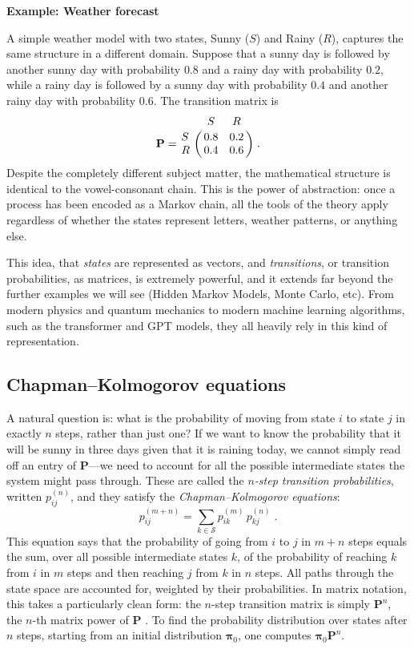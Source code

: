 \medskip

\textbf{Example: Weather forecast}

\medskip

A simple weather model with two states, Sunny ($S$) and Rainy ($R$), captures the same structure in a different domain. Suppose that a sunny day is followed by another sunny day with probability $0.8$ and a rainy day with probability $0.2$, while a rainy day is followed by a sunny day with probability $0.4$ and another rainy day with probability $0.6$. The transition matrix is
\[
    \mathbf{P} = \bordermatrix{
        & S & R \cr
        S & 0.8 & 0.2 \cr
        R & 0.4 & 0.6
    } \; .
\]
Despite the completely different subject matter, the mathematical structure is identical to the vowel-consonant chain. This is the power of abstraction: once a process has been encoded as a Markov chain, all the tools of the theory apply regardless of whether the states represent letters, weather patterns, or anything else.

\medskip

This idea, that \textit{states} are represented as vectors, and \textit{transitions}, or transition probabilities, as matrices, is extremely powerful, and it extends far beyond the further examples we will see (Hidden Markov Models, Monte Carlo, etc). From modern physics and quantum mechanics to modern machine learning algorithms, such as the transformer and GPT models, they all heavily rely in this kind of representation.

\subsection*{Chapman--Kolmogorov equations}

A natural question is: what is the probability of moving from state $i$ to state $j$ in exactly $n$ steps, rather than just one? If we want to know the probability that it will be sunny in three days given that it is raining today, we cannot simply read off an entry of $\mathbf{P}$---we need to account for all the possible intermediate states the system might pass through. These are called the \textit{$n$-step transition probabilities}, written $p_{ij}^{(n)}$, and they satisfy the \textit{Chapman--Kolmogorov equations}:
\begin{equation}
    p_{ij}^{(m+n)} = \sum_{k \in \mathcal{S}} p_{ik}^{(m)} \, p_{kj}^{(n)} \; .
\end{equation}
This equation says that the probability of going from $i$ to $j$ in $m+n$ steps equals the sum, over all possible intermediate states $k$, of the probability of reaching $k$ from $i$ in $m$ steps and then reaching $j$ from $k$ in $n$ steps. All paths through the state space are accounted for, weighted by their probabilities. In matrix notation, this takes a particularly clean form: the $n$-step transition matrix is simply $\mathbf{P}^n$, the $n$-th matrix power of $\mathbf{P}$ \cite{norris_1997_markov}. To find the probability distribution over states after $n$ steps, starting from an initial distribution $\boldsymbol{\pi}_0$, one computes $\boldsymbol{\pi}_0 \mathbf{P}^n$.

